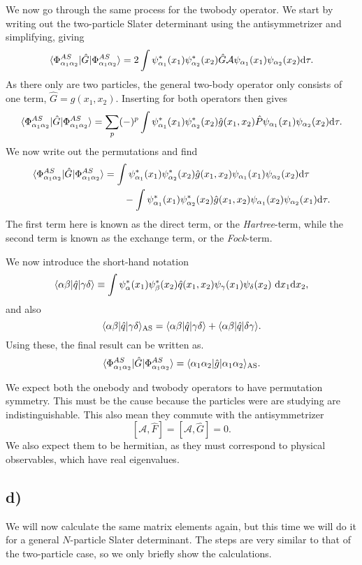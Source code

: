 \documentclass[a4paper, 11pt, notitlepage, english]{article}
\newcommand{\op}[1]{\hat{#1}}
\newcommand{\braopket}[3]{\langle #1 | {#2} | #3 \rangle}
\renewcommand{\d}{{\rm d}}
\begin{document}
We now go through the same process for the twobody operator. We start by writing out the two-particle Slater determinant using the antisymmetrizer and simplifying, giving
$$\braopket{\Phi^{AS}_{\alpha_1\alpha_2}}{\op{G}}{\Phi^{AS}_{\alpha_1\alpha_2}} = 2\int \psi^*_{\alpha_1}(x_1)\psi^*_{\alpha_2}(x_2) \op{G} \mathcal{A} \psi_{\alpha_1}(x_1) \psi_{\alpha_2}(x_2) \d \tau.$$
As there only are two particles, the general two-body operator only consists of one term, $\op{G} = g(x_1,x_2)$. Inserting for both operators then gives
$$\braopket{\Phi^{AS}_{\alpha_1\alpha_2}}{\op{G}}{\Phi^{AS}_{\alpha_1\alpha_2}} = \sum_p (-)^p \int \psi^*_{\alpha_1}(x_1)\psi^*_{\alpha_2}(x_2) \op{g}(x_1,x_2) \op{P} \psi_{\alpha_1}(x_1) \psi_{\alpha_2}(x_2) \d \tau.$$
We now write out the permutations and find
\begin{align*}
\braopket{\Phi^{AS}_{\alpha_1\alpha_2}}{\op{G}}{\Phi^{AS}_{\alpha_1\alpha_2}} &=  \int \psi^*_{\alpha_1}(x_1)\psi^*_{\alpha_2}(x_2) \op{g}(x_1,x_2) \psi_{\alpha_1}(x_1) \psi_{\alpha_2}(x_2) \d \tau \\ 
&\qquad - \int \psi^*_{\alpha_1}(x_1)\psi^*_{\alpha_2}(x_2) \op{g}(x_1,x_2)  \psi_{\alpha_1}(x_2) \psi_{\alpha_2}(x_1) \d \tau.
\end{align*}
The first term here is known as the direct term, or the \emph{Hartree}-term, while the second term is known as the exchange term, or the \emph{Fock}-term.

We now introduce the short-hand notation
$$\braopket{\alpha \beta}{\op{q}}{\gamma \delta} \equiv \int \psi^*_{\alpha}(x_1)\psi^*_{\beta}(x_2) \op{q}(x_1,x_2) \psi_{\gamma}(x_1)\psi_{\delta}(x_2) \ \d x_1 \d x_2,$$
and also
$$\braopket{\alpha \beta}{\op{q}}{\gamma \delta}_{\rm AS} = \braopket{\alpha \beta}{\op{q}}{\gamma \delta} + \braopket{\alpha \beta}{\op{q}}{\delta \gamma}.$$
Using these, the final result can be written as.
$$\braopket{\Phi^{AS}_{\alpha_1\alpha_2}}{\op{G}}{\Phi^{AS}_{\alpha_1\alpha_2}} = \braopket{\alpha_1\alpha_2}{\op{g}}{\alpha_1 \alpha_2}_{\rm AS}.$$

We expect both the onebody and twobody operators to have permutation symmetry. This must be the cause because the particles were are studying are indistinguishable. This also mean they commute with the antisymmetrizer
$$[\mathcal{A},\op{F}] = [\mathcal{A},\op{G}] = 0.$$
We also expect them to be hermitian, as they must correspond to physical observables, which have real eigenvalues.


\subsection*{d)}
We will now calculate the same matrix elements again, but this time we will do it for a general $N$-particle Slater determinant. The steps are very similar to that of the two-particle case, so we only briefly show the calculations.
\end{document}
